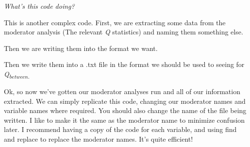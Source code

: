 \documentclass[
]{book}
\newenvironment{Shaded}{\begin{snugshade}}{\end{snugshade}}
\newcommand{\AttributeTok}[1]{\textcolor[rgb]{0.13,0.29,0.53}{#1}}
\newcommand{\CommentTok}[1]{\textcolor[rgb]{0.56,0.35,0.01}{\textit{#1}}}
\newcommand{\ConstantTok}[1]{\textcolor[rgb]{0.56,0.35,0.01}{#1}}
\newcommand{\DecValTok}[1]{\textcolor[rgb]{0.00,0.00,0.81}{#1}}
\newcommand{\FunctionTok}[1]{\textcolor[rgb]{0.13,0.29,0.53}{\textbf{#1}}}
\newcommand{\NormalTok}[1]{#1}
\newcommand{\OtherTok}[1]{\textcolor[rgb]{0.56,0.35,0.01}{#1}}
\newcommand{\SpecialCharTok}[1]{\textcolor[rgb]{0.81,0.36,0.00}{\textbf{#1}}}
\newcommand{\StringTok}[1]{\textcolor[rgb]{0.31,0.60,0.02}{#1}}
\begin{document}
\begin{Shaded}
\end{Shaded}

\emph{What's this code doing?}

This is another complex code. First, we are extracting some data from the moderator analysis (The relevant \emph{Q} statistics) and naming them something else.

Then we are writing them into the format we want.

Then we write them into a .txt file in the format we should be used to seeing for \emph{Q\textsubscript{between.}}

Ok, so now we've gotten our moderator analyses run and all of our information extracted. We can simply replicate this code, changing our moderator names and variable names where required. You should also change the name of the file being written. I like to make it the same as the moderator name to minimize confusion later. I recommend having a copy of the code for each variable, and using find and replace to replace the moderator names. It's quite efficient!
\end{document}
